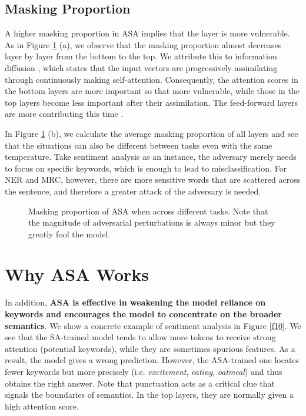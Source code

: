 \documentclass[letterpaper]{article} \usepackage{aaai23}  \usepackage{times}  \usepackage{helvet}  \usepackage{courier}  \usepackage[hyphens]{url}  \usepackage{graphicx} \urlstyle{rm} \def\UrlFont{\rm}  \usepackage{natbib}  \usepackage{caption} \frenchspacing  \setlength{\pdfpagewidth}{8.5in}  \setlength{\pdfpageheight}{11in}  \usepackage{algorithm}
\begin{document}
\subsection{Masking Proportion}

A higher masking proportion in ASA implies that the layer is more vulnerable. As in Figure \ref{f6} (a), we observe that the masking proportion almost decreases layer by layer from the bottom to the top. We attribute this to information diffusion \citep{DBLP:conf/icml/GoyalCRCSV20}, which states that the input vectors are progressively assimilating through continuously making self-attention. Consequently, the attention scores in the bottom layers are more important so that more vulnerable, while those in the top layers become less important after their assimilation. The feed-forward layers are more contributing this time \citep{DBLP:conf/acl/YouSI20}.

In Figure \ref{f6} (b), we calculate the average masking proportion of all layers and see that the situations can also be different between tasks even with the same temperature. Take sentiment analysis as an instance, the adversary merely needs to focus on specific keywords, which is enough to lead to misclassification. For NER and MRC, however, there are more sensitive words that are scattered across the sentence, and therefore a greater attack of the adversary is needed.

\begin{figure}
\centering
{}
\caption{Masking proportion of ASA when  across different tasks. Note that the magnitude of adversarial perturbations is always minor but they greatly fool the model.}
\label{f6}
\end{figure}


\section{Why ASA Works}

In addition, \textbf{ASA is effective in weakening the model reliance on keywords and encourages the model to concentrate on the broader semantics}. We show a concrete example of sentiment analysis in Figure \ref{f10}. We see that the SA-trained model tends to allow more tokens to receive strong attention (potential keywords), while they are sometimes spurious features. As a result, the model gives a wrong prediction. However, the ASA-trained one locates fewer keywords but more precisely (i.e. \textit{excitement}, \textit{eating}, \textit{oatmeal}) and thus obtains the right answer. Note that punctuation acts as a critical clue that signals the boundaries of semantics. In the top layers, they are normally given a high attention score.
\end{document}
